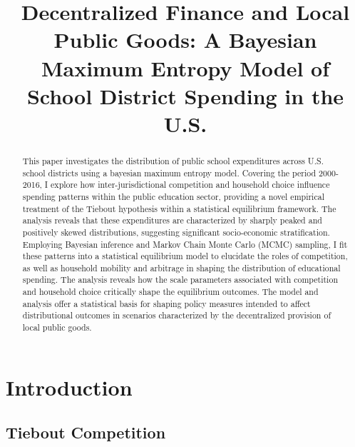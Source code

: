 
\title{Decentralized Finance and Local Public Goods: A Bayesian Maximum Entropy Model of School District Spending in the U.S.}
\maketitle

\begin{abstract}
This paper investigates the distribution of public school expenditures across U.S. school districts using a bayesian maximum entropy model.  Covering the period 2000-2016, I explore how inter-jurisdictional competition and household choice influence spending patterns within the public education sector, providing a novel empirical treatment of the Tiebout hypothesis within a statistical equilibrium framework.  The analysis reveals that these expenditures are characterized by sharply peaked and positively skewed distributions, suggesting significant socio-economic stratification. Employing Bayesian inference and Markov Chain Monte Carlo (MCMC) sampling, I fit these patterns into a statistical equilibrium model to elucidate the roles of competition, as well as household mobility and arbitrage in shaping the distribution of educational spending. The analysis reveals how the scale parameters associated with competition and household choice critically shape the equilibrium outcomes. The model and analysis offer a statistical basis for shaping policy measures intended to affect distributional outcomes in scenarios characterized by the decentralized provision of local public goods.
\end{abstract}






\section{Introduction}
\label{sec-1}

\subsection{Tiebout Competition}
\label{sec-1-1}

